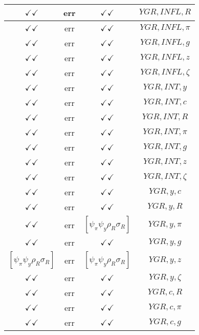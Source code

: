 \documentclass[a4paper,10pt]{article}
\begin{document}
\begin{longtable}{|c|c|c|c|}
$\checkmark\checkmark$ & err & $\checkmark\checkmark$ & ${YGR},{INFL},{R}$ \\
\hline
$\checkmark\checkmark$ & err & $\checkmark\checkmark$ & ${YGR},{INFL},{\pi}$ \\
\hline
$\checkmark\checkmark$ & err & $\checkmark\checkmark$ & ${YGR},{INFL},{g}$ \\
\hline
$\checkmark\checkmark$ & err & $\checkmark\checkmark$ & ${YGR},{INFL},{z}$ \\
\hline
$\checkmark\checkmark$ & err & $\checkmark\checkmark$ & ${YGR},{INFL},{\zeta}$ \\
\hline
$\checkmark\checkmark$ & err & $\checkmark\checkmark$ & ${YGR},{INT},{y}$ \\
\hline
$\checkmark\checkmark$ & err & $\checkmark\checkmark$ & ${YGR},{INT},{c}$ \\
\hline
$\checkmark\checkmark$ & err & $\checkmark\checkmark$ & ${YGR},{INT},{R}$ \\
\hline
$\checkmark\checkmark$ & err & $\checkmark\checkmark$ & ${YGR},{INT},{\pi}$ \\
\hline
$\checkmark\checkmark$ & err & $\checkmark\checkmark$ & ${YGR},{INT},{g}$ \\
\hline
$\checkmark\checkmark$ & err & $\checkmark\checkmark$ & ${YGR},{INT},{z}$ \\
\hline
$\checkmark\checkmark$ & err & $\checkmark\checkmark$ & ${YGR},{INT},{\zeta}$ \\
\hline
$\checkmark\checkmark$ & err & $\checkmark\checkmark$ & ${YGR},{y},{c}$ \\
\hline
$\checkmark\checkmark$ & err & $\checkmark\checkmark$ & ${YGR},{y},{R}$ \\
\hline
$\checkmark\checkmark$ & err & $[\psi_\pi \psi_y \rho_R \sigma_R ]$ & ${YGR},{y},{\pi}$ \\
\hline
$\checkmark\checkmark$ & err & $\checkmark\checkmark$ & ${YGR},{y},{g}$ \\
\hline
$[\psi_\pi \psi_y \rho_R \sigma_R ]$ & err & $[\psi_\pi \psi_y \rho_R \sigma_R ]$ & ${YGR},{y},{z}$ \\
\hline
$\checkmark\checkmark$ & err & $\checkmark\checkmark$ & ${YGR},{y},{\zeta}$ \\
\hline
$\checkmark\checkmark$ & err & $\checkmark\checkmark$ & ${YGR},{c},{R}$ \\
\hline
$\checkmark\checkmark$ & err & $\checkmark\checkmark$ & ${YGR},{c},{\pi}$ \\
\hline
$\checkmark\checkmark$ & err & $\checkmark\checkmark$ & ${YGR},{c},{g}$ \\

\end{longtable}
\end{document}
